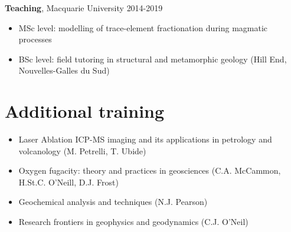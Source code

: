 \documentclass[a4paper,11pt]{article}
\begin{document}
\textbf{Teaching}, Macquarie University
\hfill {2014-2019}
    \begin{itemize}[label={},itemsep=0pt,parsep=0pt]
        \item MSc level: modelling of trace-element fractionation during magmatic processes 
        \item BSc level: field tutoring in structural and metamorphic geology (Hill End, Nouvelles-Galles du Sud)
    \end{itemize}

\section{Additional training}

    \begin{itemize}[label={},itemsep=0pt,parsep=0pt]
        \item Laser Ablation ICP-MS imaging and its applications in petrology and volcanology (M. Petrelli, T. Ubide)
        \item Oxygen fugacity: theory and practices in geosciences (C.A. McCammon, H.St.C. O’Neill, D.J. Frost)
        \item Geochemical analysis and techniques (N.J. Pearson)
        \item Research frontiers in geophysics and geodynamics (C.J. O’Neil)
    \end{itemize}
    
%    
%

\end{document}
